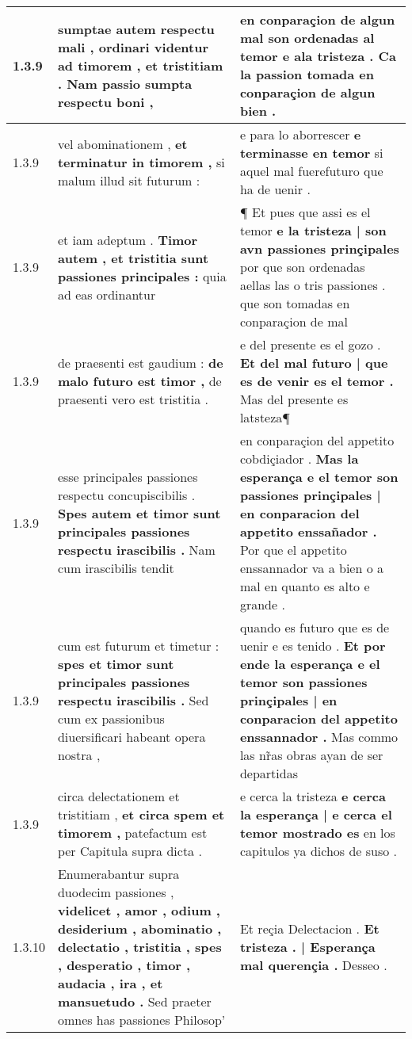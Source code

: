 \begin{tabular}{|p{1cm}|p{6.5cm}|p{6.5cm}|}
1.3.9 & sumptae autem respectu mali , \textbf{ ordinari videntur ad timorem , et tristitiam . } Nam passio sumpta respectu boni , & en conparaçion de algun mal \textbf{ son ordenadas al temor e ala tristeza . } Ca la passion tomada en conparaçion de algun bien . \\\hline
1.3.9 & vel abominationem , \textbf{ et terminatur in timorem , } si malum illud sit futurum : & e para lo aborrescer \textbf{ e terminasse en temor } si aquel mal fuerefuturo que ha de uenir . \\\hline
1.3.9 & et iam adeptum . \textbf{ Timor autem , et tristitia sunt passiones principales : } quia ad eas ordinantur & ¶ Et pues que assi es el temor \textbf{ e la tristeza | son avn passiones prinçipales } por que son ordenadas aellas las o tris passiones . que son tomadas en conparaçion de mal \\\hline
1.3.9 & de praesenti est gaudium : \textbf{ de malo futuro est timor , } de praesenti vero est tristitia . & e del presente es el gozo . \textbf{ Et del mal futuro | que es de venir es el temor . } Mas del presente es latsteza¶ \\\hline
1.3.9 & esse principales passiones respectu concupiscibilis . \textbf{ Spes autem et timor sunt principales passiones respectu irascibilis . } Nam cum irascibilis tendit & en conparaçion del appetito cobdiçiador . \textbf{ Mas la esperança e el temor son passiones prinçipales | en conparacion del appetito enssañador . } Por que el appetito enssannador va a bien o a mal en quanto es alto e grande . \\\hline
1.3.9 & cum est futurum et timetur : \textbf{ spes et timor sunt principales passiones respectu irascibilis . } Sed cum ex passionibus diuersificari habeant opera nostra , & quando es futuro que es de uenir e es tenido . \textbf{ Et por ende la esperança e el temor son passiones prinçipales | en conparacion del appetito enssannador . } Mas commo las nr̃as obras ayan de ser departidas \\\hline
1.3.9 & circa delectationem et tristitiam , \textbf{ et circa spem et timorem , } patefactum est per Capitula supra dicta . & e cerca la tristeza \textbf{ e cerca la esperança | e cerca el temor mostrado es } en los capitulos ya dichos de suso . \\\hline
1.3.10 & Enumerabantur supra duodecim passiones , \textbf{ videlicet , amor , odium , desiderium , abominatio , delectatio , tristitia , spes , desperatio , timor , audacia , ira , et mansuetudo . } Sed praeter omnes has passiones Philosop’ & Et reçia Delectacion . \textbf{ Et tristeza . | Esperança mal querençia . } Desseo . \\\hline

\end{tabular}
